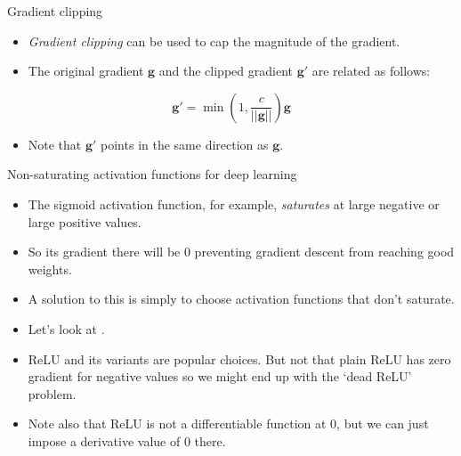 \documentclass[10pt]{beamer}
\begin{document}
\begin{titledslide}{Gradient clipping}

  \begin{itemize}
  \item \emph{Gradient clipping} can be used to cap the magnitude of
    the gradient.
  \item The original gradient $\mathbf{g}$ and the clipped gradient
    $\mathbf{g}'$ are related as follows:
  \end{itemize}

  \[
    \mathbf{g}' = \min \left(1, \frac{c}{||\mathbf{g}||}\right)\mathbf{g}
  \]

  \begin{itemize}
  \item   Note that $\mathbf{g}'$ points in the same direction as $\mathbf{g}$.
  \end{itemize}

\end{titledslide}
\begin{titledslide}{Non-saturating activation functions for deep learning}

  \begin{itemize}
  \item The sigmoid activation function, for example, \emph{saturates}
    at large negative or large positive values.
  \item So its gradient there will be 0 preventing gradient descent
    from reaching good weights.
  \item A solution to this is simply to choose activation functions
    that don't saturate.
  \item Let's look at \cite[Fig~13.2]{pml1Book}.
  \item ReLU and its variants are popular choices. But not that plain
    ReLU has zero gradient for negative values so we might end up with
    the `dead ReLU' problem.
  \item Note also that ReLU is not a differentiable function at 0, but we
    can just impose a derivative value of 0 there.
  \end{itemize}
  
\end{titledslide}
\end{document}
